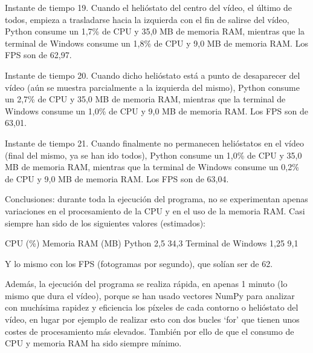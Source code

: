 \documentclass[12pt]{article}
\begin{document}
Instante de tiempo 19. Cuando el helióstato del centro del vídeo, el último de todos, empieza a trasladarse hacia la izquierda con el fin de salirse del vídeo, Python consume un 1,7\% de CPU y 35,0 MB de memoria RAM, mientras que la terminal de Windows consume un 1,8\% de CPU y 9,0 MB de memoria RAM. Los FPS son de 62,97.




Instante de tiempo 20. Cuando dicho helióstato está a punto de desaparecer del vídeo (aún se muestra parcialmente a la izquierda del mismo), Python consume un 2,7\% de CPU y 35,0 MB de memoria RAM, mientras que la terminal de Windows consume un 1,0\% de CPU y 9,0 MB de memoria RAM. Los FPS son de 63,01.




Instante de tiempo 21. Cuando finalmente no permanecen helióstatos en el vídeo (final del mismo, ya se han ido todos), Python consume un 1,0\% de CPU y 35,0 MB de memoria RAM, mientras que la terminal de Windows consume un 0,2\% de CPU y 9,0 MB de memoria RAM. Los FPS son de 63,04.

Conclusiones: durante toda la ejecución del programa, no se experimentan apenas variaciones en el procesamiento de la CPU y en el uso de la memoria RAM. Casi siempre han sido de los siguientes valores (estimados):

				CPU (\%)	Memoria RAM (MB)
Python				2,5		34,3
Terminal de Windows		1,25		9,1

Y lo mismo con los FPS (fotogramas por segundo), que solían ser de 62.

Además, la ejecución del programa se realiza rápida, en apenas 1 minuto (lo mismo que dura el vídeo), porque se han usado vectores NumPy para analizar con muchísima rapidez y eficiencia los píxeles de cada contorno o helióstato del vídeo, en lugar por ejemplo de realizar esto con dos bucles ‘for’ que tienen unos costes de procesamiento más elevados. También por ello de que el consumo de CPU y memoria RAM ha sido siempre mínimo.
\end{document}
